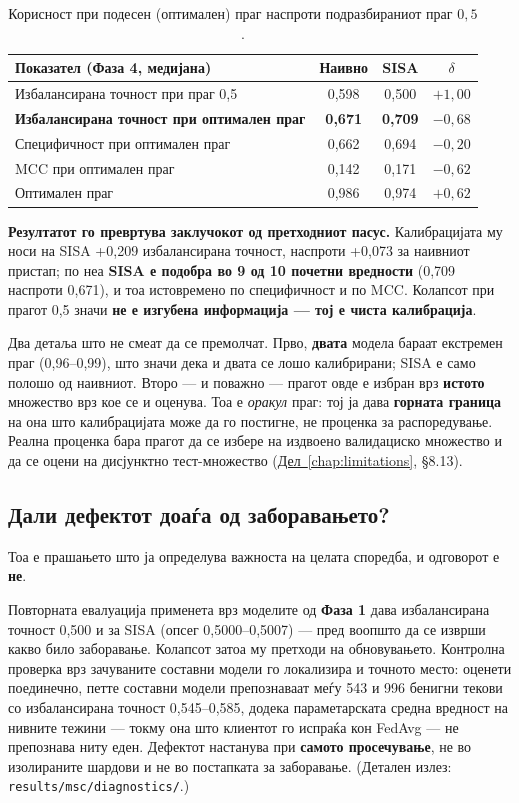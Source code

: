 \begin{table}[htbp]
\centering
\caption{Корисност при подесен (оптимален) праг наспроти подразбираниот праг $0{,}5$.}
\label{tab:utility-tuned-threshold}
\begin{tabular}{lccc}
\toprule
Показател (Фаза 4, медијана) & Наивно & SISA & $\delta$ \\
\midrule
Избалансирана точност при праг 0,5 & 0,598 & 0,500 & $+1{,}00$ \\
\textbf{Избалансирана точност при оптимален праг} & \textbf{0,671} & \textbf{0,709} & \textbf{$-0{,}68$} \\
Специфичност при оптимален праг & 0,662 & 0,694 & $-0{,}20$ \\
MCC при оптимален праг & 0,142 & 0,171 & $-0{,}62$ \\
Оптимален праг & 0,986 & 0,974 & $+0{,}62$ \\
\bottomrule
\end{tabular}
\end{table}

\textbf{Резултатот го превртува заклучокот од претходниот пасус.} Калибрацијата му носи на SISA
+0,209 избалансирана точност, наспроти +0,073 за наивниот пристап; по неа \textbf{SISA е подобра во
9 од 10 почетни вредности} (0,709 наспроти 0,671), и тоа истовремено по специфичност и по
MCC. Колапсот при прагот 0,5 значи \textbf{не е изгубена информација --- тој е чиста калибрација}.

Два детаља што не смеат да се премолчат. Прво, \textbf{двата} модела бараат екстремен праг
(0,96–0,99), што значи дека и двата се лошо калибрирани; SISA е само полошо од наивниот.
Второ --- и поважно --- прагот овде е избран врз \textbf{истото} множество врз кое се и оценува.
Тоа е \emph{оракул} праг: тој ја дава \textbf{горната граница} на она што калибрацијата може да го
постигне, не проценка за распоредување. Реална проценка бара прагот да се избере на
издвоено валидациско множество и да се оцени на дисјунктно тест-множество
(\hyperref[chap:limitations]{Дел~\ref*{chap:limitations}}, §8.13).

\subsection{Дали дефектот доаѓа од заборавањето?}

Тоа е прашањето што ја определува важноста на целата споредба, и одговорот е \textbf{не}.

Повторната евалуација применета врз моделите од \textbf{Фаза 1} дава избалансирана точност 0,500
и за SISA (опсег 0,5000–0,5007) --- пред воопшто да се изврши какво било заборавање. Колапсот
затоа му претходи на обновувањето. Контролна проверка врз зачуваните составни модели го
локализира и точното место: оценети поединечно, петте составни модели препознаваат меѓу 543
и 996 бенигни текови со избалансирана точност 0,545–0,585, додека параметарската средна
вредност на нивните тежини --- токму она што клиентот го испраќа кон FedAvg --- не препознава
ниту еден. Дефектот настанува при \textbf{самото просечување}, не во изолираните шардови и не во
постапката за заборавање. (Детален излез: \texttt{results/msc/diagnostics/}.)

